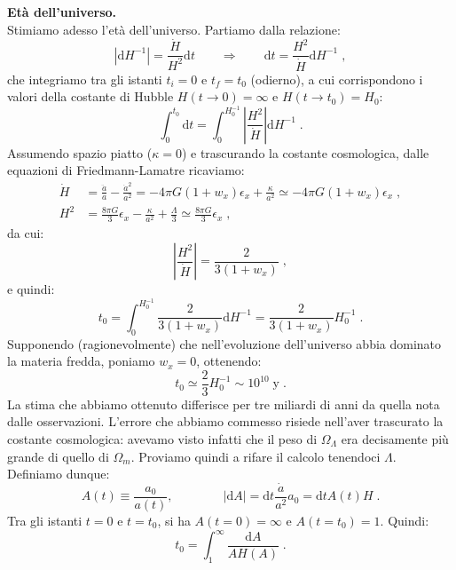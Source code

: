 \documentclass[12pt,a4paper]{report}
\theoremstyle{definition}
\newcommand{\diff}[1][]{\mathrm{d}#1}
\begin{document}
\textbf{Età dell'universo.} \\
Stimiamo adesso l'età dell'universo. Partiamo dalla relazione:
\begin{equation}
\left|\diff{H^{-1}}\right|=\frac{\dot{H}}{H^2}\diff{t}\qquad \Longrightarrow \qquad \diff{t}=\frac{H^2}{\dot{H}}\diff{H^{-1}}\;,
\end{equation}
che integriamo tra gli istanti $t_i=0$ e $t_f=t_0$ (odierno), a cui corrispondono i valori della costante di Hubble $H(t\to 0)=\infty$ e $H(t\to t_0)=H_0$:
\begin{equation}
\int_0^{t_0}\diff{t}=\int_0^{H_0^{-1}}\left|\frac{H^2}{\dot{H}}\right|\diff{H^{-1}}\;.
\end{equation}
Assumendo spazio piatto ($\kappa=0$) e trascurando la costante cosmologica, dalle equazioni di Friedmann-Lamatre ricaviamo:
\begin{align*}
\dot{H}&=\frac{\ddot{a}}{a}-\frac{\dot{a}^2}{a^2}=-4\pi G(1+w_x)\epsilon_x+\frac{\kappa}{a^2}\simeq -4\pi G(1+w_x)\epsilon_x\;, \\
H^2 &= \frac{8\pi G}{3}\epsilon_x-\frac{\kappa}{a^2}+\frac{\Lambda}{3}\simeq \frac{8\pi G}{3}\epsilon_x\;,
\end{align*}
da cui:
\begin{equation}
\left|\frac{H^2}{\dot{H}}\right|=\frac{2}{3(1+w_x)}\;,
\end{equation}
e quindi:
\begin{equation}
t_0=\int_0^{H_0^{-1}}\frac{2}{3(1+w_x)}\diff{H^{-1}}=\frac{2}{3(1+w_x)}H_0^{-1}\;.
\end{equation}
Supponendo (ragionevolmente) che nell'evoluzione dell'universo abbia dominato la materia fredda, poniamo $w_x=0$, ottenendo:
\begin{equation}
t_0\simeq \frac{2}{3}H_0^{-1}\sim 10^{10}\;\mbox{y}\;.
\end{equation}
La stima che abbiamo ottenuto differisce per tre miliardi di anni da quella nota dalle osservazioni. L'errore che abbiamo commesso risiede nell'aver trascurato la costante cosmologica: avevamo visto infatti che il peso di $\Omega_{\Lambda}$ era decisamente più grande di quello di $\Omega_m$. Proviamo quindi a rifare il calcolo tenendoci $\Lambda$. Definiamo dunque:
\begin{equation}
A(t)\equiv \frac{a_0}{a(t)},\qquad\qquad \left|\diff{A}\right|=\diff{t}\frac{\dot{a}}{a^2}a_0=\diff{t}A(t)H\;.
\end{equation}
Tra gli istanti $t=0$ e $t=t_0$, si ha $A(t=0)=\infty$ e $A(t=t_0)=1$. Quindi:
$$
t_0=\int_1^{\infty}\frac{\diff{A}}{AH(A)}\;.
$$
\end{document}
